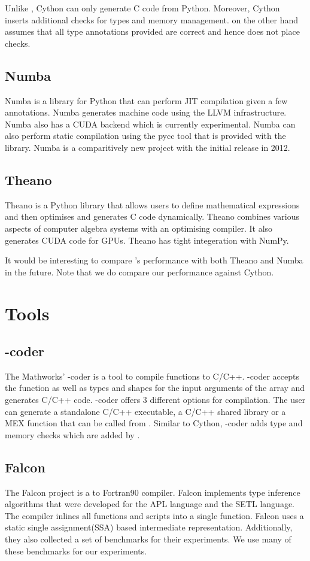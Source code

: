 Unlike \velocty, Cython can only generate C code from Python. Moreover, Cython inserts additional checks for types and memory management. \velocty on the other hand assumes that all type annotations provided are correct and hence does not place checks.
\subsection{Numba}
Numba\cite{numba} is a library for Python that can perform JIT compilation given a few annotations. Numba generates machine code using the LLVM\cite{Lattner:2004:LCF:977395.977673} infrastructure. Numba also has a CUDA\cite{Nickolls:2008:SPP:1365490.1365500} backend which is currently experimental. Numba can also perform static compilation using the pycc tool that is provided with the library. Numba is a comparitively new project with the initial release in 2012. 
\subsection{Theano}
Theano\cite{Bastien-Theano-2012} is a Python library that allows users to define mathematical expressions and then optimises and generates C code dynamically. Theano combines various aspects of computer algebra systems with an optimising compiler. It also generates CUDA code for GPUs. Theano has tight integeration with NumPy.

It would be interesting to compare \velocty's performance with both Theano and Numba in the future. Note that we do compare our performance against Cython. 
\section{\matlab Tools}
\subsection{\matlab-coder}
The Mathworks' \matlab-coder\cite{matlab-coder} is a tool to compile \matlab functions to C/C++. \matlab-coder accepts the \matlab function as well as types and shapes for the input arguments of the array and generates C/C++ code. \matlab-coder offers 3 different options for compilation. The user can generate a standalone C/C++ executable, a C/C++ shared library or a MEX\cite{mex} function that can be called from \matlab. Similar to Cython, \matlab-coder adds type and memory checks which are added by \velocty.
\subsection{Falcon}
The Falcon project\cite{DeRose:1999} is a \matlab to Fortran90 compiler. Falcon implements type inference algorithms that were developed for the APL\cite{Budd:1983:ACU:390005.801218,Joisha:2000:CDI:570406.570408,Weiss:1981:CTS:390007.805380} language and the SETL\cite{Schwartz:1975:ADS:512976.512981} language. The compiler inlines all functions and scripts into a single function. Falcon uses a static single assignment(SSA) based intermediate representation. Additionally, they also collected a set of benchmarks for their experiments. We use many of these benchmarks for our experiments. 
